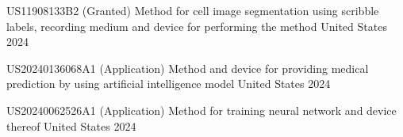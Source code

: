 
\begin{cvhonors}

  \cvhonor
    {US11908133B2 (Granted)} %
    {Method for cell image segmentation using scribble labels, recording medium and device for performing the method} %
    {United States} %
    {2024} %

  \cvhonor
    {US20240136068A1 (Application)} %
    {Method and device for providing medical prediction by using artificial intelligence model} %
    {United States} %
    {2024} %

  \cvhonor
    {US20240062526A1 (Application)} %
    {Method for training neural network and device thereof} %
    {United States} %
    {2024} %

\end{cvhonors}